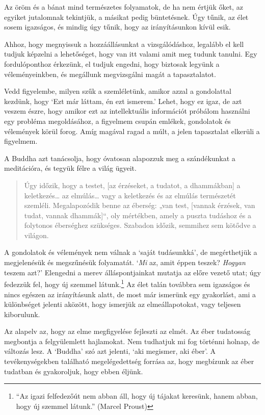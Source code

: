 Az öröm és a bánat mind természetes folyamatok, de ha nem értjük őket,
az egyiket jutalomnak tekintjük, a másikat pedig büntetésnek. Úgy tűnik,
az élet sosem igazságos, és mindig úgy tűnik, hogy az irányításunkon
kívül esik.

Ahhoz, hogy megnyissuk a hozzáállásunkat a vizsgálódáshoz, legalább el
kell tudjuk képzelni a lehetőséget, hogy van itt valami amit meg tudunk
tanulni. Egy fordulóponthoz érkezünk, el tudjuk engedni, hogy biztosak
legyünk a véleményeinkben, és megállunk megvizsgálni magát a
tapasztalatot.

Vedd figyelembe, milyen szűk a szemléletünk, amikor azzal a gondolattal
kezdünk, hogy `Ezt már láttam, én ezt ismerem.' Lehet, hogy ez igaz, de
azt veszem észre, hogy amikor ezt az intellektuális információt próbálom
használni egy probléma megoldásához, a figyelmem csupán emlékek,
gondolatok és vélemények körül forog. Amíg magával ragad a múlt, a jelen
tapasztalat elkerüli a figyelmem.

A Buddha azt tanácsolja, hogy óvatosan alapozzuk meg a szándékunkat a
meditációra, és tegyük félre a világ ügyeit.

\begin{quote}
Úgy időzik, hogy a testet, {[}az érzéseket, a tudatot, a dhammákban{]} a
keletkezés\ldots{} az elmúlás\ldots{} vagy a keletkezés és az elmúlás
természetét szemléli. Megalapozódik benne az éberség: „van test,
{[}vannak érzések, van tudat, vannak dhammák{]}``, oly mértékben, amely
a puszta tudáshoz és a folytonos éberséghez szükséges. Szabadon időzik,
semmihez sem kötődve a világon.

\bigskip

\end{quote}

A gondolatok és vélemények nem válnak a `saját tudásunkká', de
megérthetjük a megjelenésük és megszűnésük folyamatát. `\emph{Mi} az,
amit éppen teszek? \emph{Hogyan} teszem azt?' Elengedni a merev
álláspontjainkat mutatja az előre vezető utat; úgy fedezzük fel, hogy új
szemmel látunk.\footnote{``Az igazi felfedezőút nem abban áll, hogy új
  tájakat keresünk, hanem abban, hogy új szemmel látunk.'' (Marcel
  Proust)} Az élet talán továbbra sem igazságos és nincs egészen az
irányításunk alatt, de most már ismerünk egy gyakorlást, ami a
különbséget jelenti aközött, hogy ismerjük az elmeállapotokat, vagy
teljesen kiborulunk.

Az alapelv az, hogy az elme megfigyelése fejleszti az elmét. Az éber
tudatosság megbontja a felgyülemlett hajlamokat. Nem tudhatjuk mi fog
történni holnap, de változás lesz. A `Buddha' szó azt jelenti, `aki
megismer, aki éber'. A tevékenységekben található megelégedettség
forrása az, hogy megbízunk az éber tudatban és gyakoroljuk, hogy ebben
éljünk.
